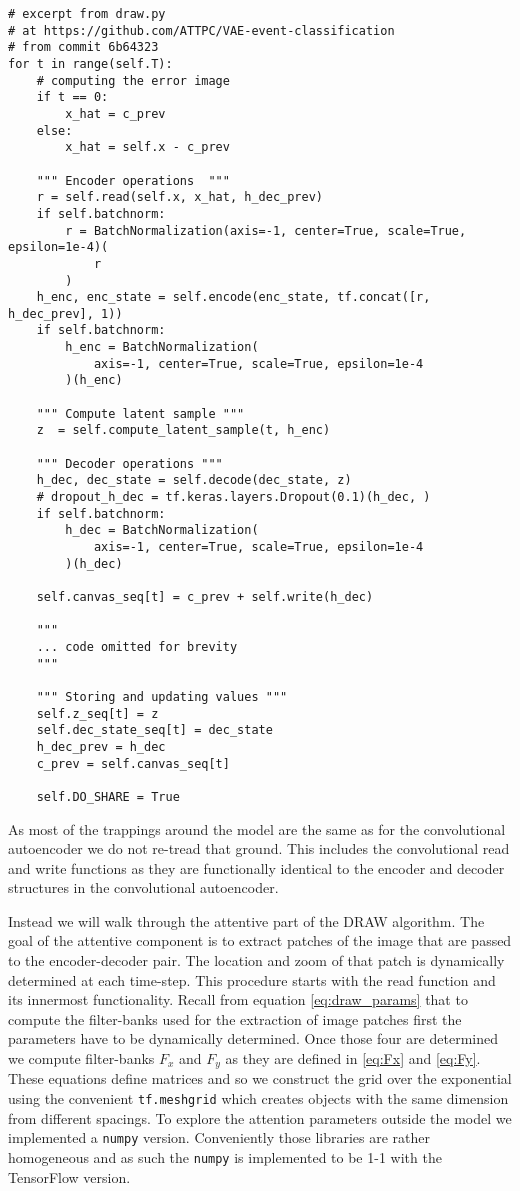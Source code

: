 \begin{minipage}{\linewidth}
\begin{lstlisting}[language=iPython]
# excerpt from draw.py
# at https://github.com/ATTPC/VAE-event-classification
# from commit 6b64323
for t in range(self.T):
	# computing the error image
	if t == 0:
	    x_hat = c_prev
	else:
	    x_hat = self.x - c_prev

	""" Encoder operations  """
	r = self.read(self.x, x_hat, h_dec_prev)
	if self.batchnorm:
	    r = BatchNormalization(axis=-1, center=True, scale=True, epsilon=1e-4)(
	        r
	    )
	h_enc, enc_state = self.encode(enc_state, tf.concat([r, h_dec_prev], 1))
	if self.batchnorm:
	    h_enc = BatchNormalization(
	        axis=-1, center=True, scale=True, epsilon=1e-4
	    )(h_enc)

	""" Compute latent sample """
	z  = self.compute_latent_sample(t, h_enc)

	""" Decoder operations """
	h_dec, dec_state = self.decode(dec_state, z)
	# dropout_h_dec = tf.keras.layers.Dropout(0.1)(h_dec, )
	if self.batchnorm:
	    h_dec = BatchNormalization(
	        axis=-1, center=True, scale=True, epsilon=1e-4
	    )(h_dec)

	self.canvas_seq[t] = c_prev + self.write(h_dec)

	"""
	... code omitted for brevity
	"""

	""" Storing and updating values """
	self.z_seq[t] = z
	self.dec_state_seq[t] = dec_state
	h_dec_prev = h_dec
	c_prev = self.canvas_seq[t]

	self.DO_SHARE = True
\end{lstlisting}
\end{minipage}

As most of the trappings around the model are the same as for the convolutional autoencoder we do not re-tread that ground. This includes the convolutional read and write functions as they are functionally identical to the encoder and decoder structures in the convolutional autoencoder. 

Instead we will walk through the attentive part of the DRAW algorithm. The goal of the attentive component is to extract patches of the image that are passed to the encoder-decoder pair. The location and zoom of that patch is dynamically determined at each time-step. This procedure starts with the read function and its innermost functionality. Recall from equation \ref{eq:draw_params} that to compute the filter-banks used for the extraction of image patches first the parameters have to be dynamically determined. Once those four are determined we compute filter-banks $F_x$ and $F_y$ as they are defined in \ref{eq:Fx} and \ref{eq:Fy}. These equations define matrices and so we construct the grid over the exponential using the convenient \lstinline{tf.meshgrid} which creates objects with the same dimension from different spacings. To explore the attention parameters outside the model we implemented a \lstinline{numpy} version. Conveniently those libraries are rather homogeneous and as such the \lstinline{numpy} is implemented to be 1-1 with the TensorFlow version. 

